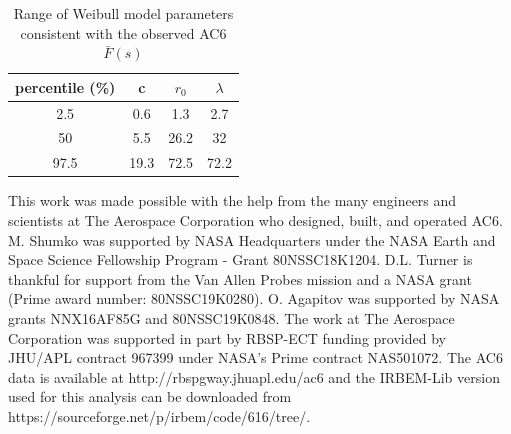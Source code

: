 \documentclass[draft]{agujournal2019}
\begin{document}
\begin{table}[h]
\caption{Range of Weibull model parameters consistent with the observed AC6  $\bar{F}(s)$}
\label{table_s2}
\centering
\begin{tabular}{|c|c|c|c|}
\hline 
percentile (\%) & c & $r_0$ & $\lambda$ \\ 
\hline 
2.5 & 0.6 & 1.3 & 2.7 \\ 
\hline 
50 & 5.5 & 26.2 & 32 \\ 
\hline 
97.5 & 19.3 & 72.5 & 72.2 \\ 
\hline 
\end{tabular} 
\end{table}

\acknowledgments
This work was made possible with the help from the many engineers and scientists at The Aerospace Corporation who designed, built, and operated AC6. M. Shumko was supported by NASA Headquarters under the NASA Earth and Space Science Fellowship Program - Grant 80NSSC18K1204. D.L. Turner is thankful for support from the Van Allen Probes mission and a NASA grant (Prime award number: 80NSSC19K0280). O. Agapitov was supported by NASA grants NNX16AF85G and 80NSSC19K0848. The work at The Aerospace Corporation was supported in part by RBSP-ECT funding provided by JHU/APL contract 967399 under NASA's Prime contract NAS501072. The AC6 data is available at http://rbspgway.jhuapl.edu/ac6 and the IRBEM-Lib version used for this analysis can be downloaded from https://sourceforge.net/p/irbem/code/616/tree/.


\end{document}
